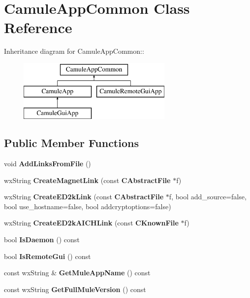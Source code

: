 \section{CamuleAppCommon Class Reference}
\label{classCamuleAppCommon}
Inheritance diagram for CamuleAppCommon::\begin{figure}[H]
\begin{center}
\leavevmode
\includegraphics[height=3cm]{classCamuleAppCommon}
\end{center}
\end{figure}
\subsection*{Public Member Functions}
\begin{DoxyCompactItemize}
\item 
void {\bfseries AddLinksFromFile} ()\label{classCamuleAppCommon_ac5a6632b575e2d980c84d7f88f18b1c2}

\item 
wxString {\bfseries CreateMagnetLink} (const {\bf CAbstractFile} $\ast$f)\label{classCamuleAppCommon_abc3f705da2b43c0ea7d9bc635d3a19a0}

\item 
wxString {\bfseries CreateED2kLink} (const {\bf CAbstractFile} $\ast$f, bool add\_\-source=false, bool use\_\-hostname=false, bool addcryptoptions=false)\label{classCamuleAppCommon_af14e87518bbed0736ad20593dc0cc02e}

\item 
wxString {\bfseries CreateED2kAICHLink} (const {\bf CKnownFile} $\ast$f)\label{classCamuleAppCommon_a454c5a7d66b2b404e20e6cad1aafda8e}

\item 
bool {\bfseries IsDaemon} () const \label{classCamuleAppCommon_a4548d75bda8ede61b54cb1662a38bc45}

\item 
bool {\bfseries IsRemoteGui} () const \label{classCamuleAppCommon_a27d5bcc754cf877fff5f30367078b0dc}

\item 
const wxString \& {\bfseries GetMuleAppName} () const \label{classCamuleAppCommon_af4dacfa1e8a53b1ff7bac4c5da983ef6}

\item 
const wxString {\bf GetFullMuleVersion} () const 
\end{DoxyCompactItemize}

